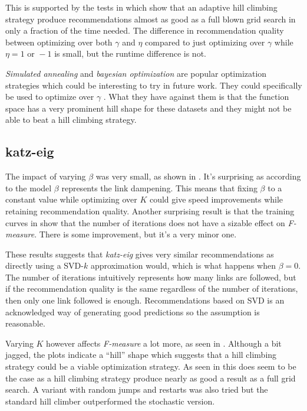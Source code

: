 This is supported by the tests in  which show that an adaptive hill climbing strategy produce recommendations almost as good as a full blown grid search in only a fraction of the time needed. The difference in recommendation quality between optimizing over both $\gamma$ and $\eta$ compared to just optimizing over $\gamma$ while $\eta = 1 \text{ or } -1$ is small, but the runtime difference is not.

\textit{Simulated annealing} and \textit{bayesian optimization} are popular optimization strategies which could be interesting to try in future work. They could specifically be used to optimize over $\gamma$ . What they have against them is that the function space has a very prominent hill shape for these datasets and they might not be able to beat a hill climbing strategy.

\subsection{katz-eig}

The impact of varying $\beta$ was very small, as shown in . It's surprising as according to the model $\beta$ represents the link dampening.  This means that fixing $\beta$ to a constant value while optimizing over $K$ could give speed improvements while retaining recommendation quality. Another surprising result is that the training curves in  show that the number of iterations does not have a sizable effect on \textit{F-measure}. There is some improvement, but it's a very minor one.

These results suggests that \textit{katz-eig} gives very similar recommendations as directly using a SVD-$k$ approximation would, which is what happens when $\beta = 0$. The number of iterations intuitively represents how many links are followed, but if the recommendation quality is the same regardless of the number of iterations, then only one link followed is enough. Recommendations based on SVD is an acknowledged way of generating good predictions \citep{bobadilla2013recommender} so the assumption is reasonable.

Varying $K$ however affects \textit{F-measure} a lot more, as seen in . Although a bit jagged, the plots indicate a ``hill'' shape which suggests that a hill climbing strategy could be a viable optimization strategy. As seen in  this does seem to be the case as a hill climbing strategy produce nearly as good a result as a full grid search. A variant with random jumps and restarts was also tried but the standard hill climber outperformed the stochastic version.

